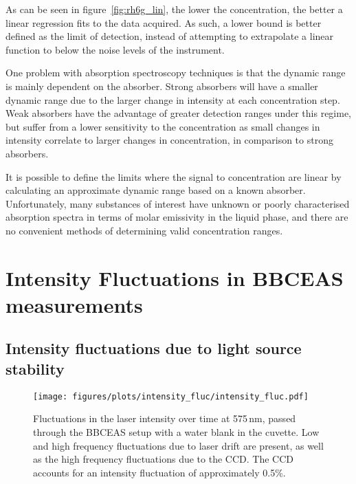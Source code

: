 As can be seen in figure~\ref{fig:rh6g_lin}, the lower the concentration,
the better a linear regression fits to the data acquired. As such, a lower
bound is better defined as the limit of detection, instead of attempting to
extrapolate a linear function to below the noise levels of the instrument.

One problem with absorption spectroscopy techniques is that the dynamic range
is mainly dependent on the absorber. Strong absorbers will have a smaller
dynamic range due to the larger change in intensity at each concentration
step. Weak absorbers have the advantage of greater detection ranges under
this regime, but suffer from a lower sensitivity to the concentration as
small changes in intensity correlate to larger changes in concentration, in
comparison to strong absorbers.

It is possible to define the limits where the signal to concentration
are linear by calculating an approximate dynamic range based on a known
absorber. Unfortunately, many substances of interest have unknown or poorly
characterised absorption spectra in terms of molar emissivity in the liquid
phase, and there are no convenient methods of determining valid concentration
ranges.



\section{Intensity Fluctuations in BBCEAS measurements}\label{sec:light_fluc}



\subsection{Intensity fluctuations due to light source stability}\label{subsec:laser_fluc}

\begin{figure}[t]
\begin{center}
  \texttt{[image: figures/plots/intensity\_fluc/intensity\_fluc.pdf]}
\end{center}
\caption[Intensity fluctuations through blank in \ac{BBCEAS} setup]{Fluctuations in the laser intensity over time at 575\,nm, passed through the \ac{BBCEAS} setup with a water blank in the cuvette. Low and high frequency fluctuations due to laser drift are present, as well as the high frequency fluctuations due to the \ac{CCD}. The \ac{CCD} accounts for an intensity fluctuation of approximately 0.5\%.}
\label{fig:laser_fluc}
\end{figure}


